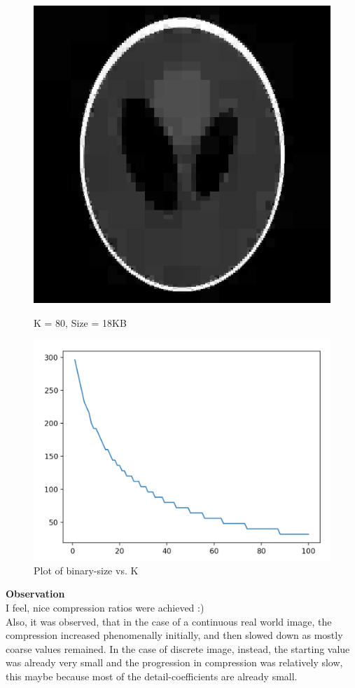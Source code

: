 \documentclass{article}
\begin{document}
    \begin{figure}[!htb]
      \includegraphics[scale=0.4]{./compression/2/80.png}
      \caption{K = 80, Size = 18KB}
    \endminipage \hfill
      \includegraphics[scale=.4]{./compression/plots/c.png}
      \caption{Plot of binary-size vs. K}
    \endminipage
    \end{figure}

    \textbf{Observation}\\
    I feel, nice compression ratios were achieved :)\\
    Also, it was observed, that in the case of a continuous real world image, the compression increased phenomenally initially, and then slowed down as mostly coarse values remained. In the case of discrete image, instead, the starting value was already very small and the progression in compression was relatively slow, this maybe because most of the detail-coefficients are already small.
    
\end{document}
